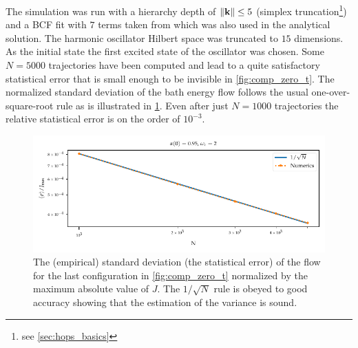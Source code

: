 The simulation was run with a hierarchy depth of \(\norm{\vb{k}} \leq 5\)
(simplex truncation\footnote{see \cref{sec:hops_basics}}) and a BCF
fit with \(7\) terms taken from \cite{RichardDiss} which was also used
in the analytical solution. The harmonic oscillator Hilbert space was
truncated to \(15\) dimensions. As the initial state the first excited
state of the oscillator was chosen. Some \(N=5000\) trajectories have
been computed and lead to a quite satisfactory statistical error that
is small enough to be invisible in \cref{fig:comp_zero_t}. The
normalized standard deviation of the bath energy flow follows the
usual one-over-square-root rule as is illustrated in
\cref{fig:sqrt_conv}. Even after just \(N=1000\) trajectories the
relative statistical error is on the order of \(10^{-3}\).
\begin{figure}[h]
  \centering
  \includegraphics{figs/analytic_comp/sqrt_convergence.pdf}
  \caption{\label{fig:sqrt_conv} The (empirical) standard deviation
    (the statistical error) of the flow for the last configuration in
    \cref{fig:comp_zero_t} normalized by the maximum absolute value of
    \(J\). The \(1/\sqrt{N}\) rule is obeyed to good accuracy showing
    that the estimation of the variance is sound.}
\end{figure}
